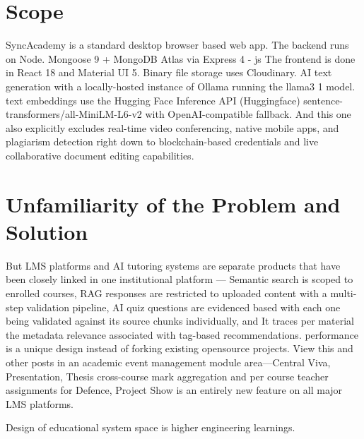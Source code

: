 \documentclass[12pt,a4paper]{report}
\begin{document}
\section{Scope}

SyncAcademy is a standard desktop browser based web app. The backend runs on Node. Mongoose 9 + MongoDB Atlas via Express 4 - js The frontend is done in React 18 and Material UI 5. Binary file storage uses Cloudinary. AI text generation with a locally-hosted instance of Ollama running the llama3 1 model. text embeddings use the Hugging Face Inference API (Huggingface) sentence-transformers/all-MiniLM-L6-v2 with OpenAI-compatible fallback. And this one also explicitly excludes real-time video conferencing, native mobile apps, and plagiarism detection right down to blockchain-based credentials and live collaborative document editing capabilities.

\section{Unfamiliarity of the Problem and Solution}

But LMS platforms and AI tutoring systems are separate products that have been closely linked in one institutional platform — Semantic search is scoped to enrolled courses, RAG responses are restricted to uploaded content with a multi-step validation pipeline,
AI quiz questions are evidenced based with each one being validated against its source chunks individually, and
It traces per material the metadata relevance associated with tag-based recommendations.
performance is a unique design instead of forking existing opensource projects.
View this and other posts in an academic event management module area—Central Viva, Presentation, Thesis
cross-course mark aggregation and per course teacher assignments for Defence, Project Show
is an entirely new feature on all major LMS platforms.

Design of educational system space is  higher engineering learnings.
\end{document}
